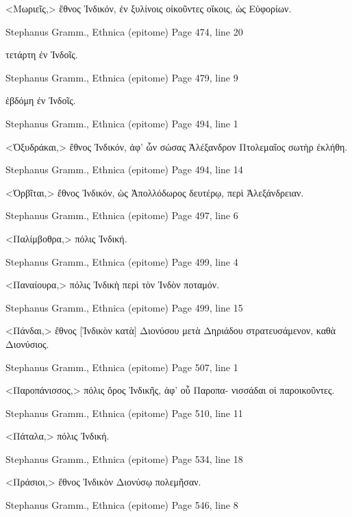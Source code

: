 \documentclass[12pt,letterpaper,twoside,final]{memoir}
\begin{document}
\begin{greek}
<Μωριεῖς,> ἔθνος Ἰνδικόν, ἐν ξυλίνοις οἰκοῦντες οἴκοις, 
ὡς Εὐφορίων. 



Stephanus Gramm., Ethnica (epitome) 
Page 474, line 20

                                             τετάρτη ἐν Ἰνδοῖς. 



Stephanus Gramm., Ethnica (epitome) 
Page 479, line 9

                             ἑβδόμη ἐν Ἰνδοῖς. 



Stephanus Gramm., Ethnica (epitome) 
Page 494, line 1

<Ὀξυδράκαι,> ἔθνος Ἰνδικόν, ἀφ' ὧν σώσας Ἀλέξανδρον 
Πτολεμαῖος σωτὴρ ἐκλήθη. 



Stephanus Gramm., Ethnica (epitome) 
Page 494, line 14

<Ὀρβῖται,> ἔθνος Ἰνδικόν, ὡς Ἀπολλόδωρος δευτέρῳ, 
περὶ Ἀλεξάνδρειαν. 



Stephanus Gramm., Ethnica (epitome) 
Page 497, line 6

<Παλίμβοθρα,> πόλις Ἰνδική. 



Stephanus Gramm., Ethnica (epitome) 
Page 499, line 4

<Παναίουρα,> πόλις Ἰνδικὴ περὶ τὸν Ἰνδὸν ποταμόν. 



Stephanus Gramm., Ethnica (epitome) 
Page 499, line 15

<Πάνδαι,> ἔθνος [Ἰνδικὸν κατὰ] Διονύσου μετὰ Δηριάδου 
στρατευσάμενον, καθὰ Διονύσιος. 



Stephanus Gramm., Ethnica (epitome) 
Page 507, line 1

<Παροπάνισσος,> πόλις ὄρος Ἰνδικῆς, ἀφ' οὗ Παροπα-
νισσάδαι οἱ παροικοῦντες. 



Stephanus Gramm., Ethnica (epitome) 
Page 510, line 11

<Πάταλα,> πόλις Ἰνδική. 



Stephanus Gramm., Ethnica (epitome) 
Page 534, line 18

<Πράσιοι,> ἔθνος Ἰνδικὸν Διονύσῳ πολεμῆσαν. 



Stephanus Gramm., Ethnica (epitome) 
Page 546, line 8


\end{greek}
\end{document}
